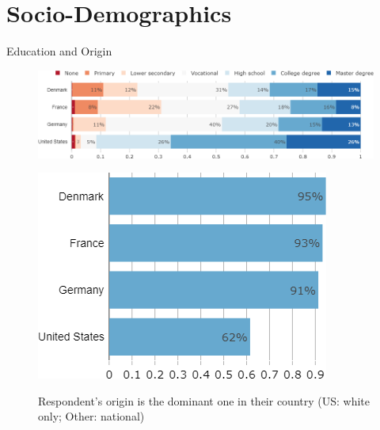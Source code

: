 \documentclass[aspectratio=169,9pt,dvipsnames]{beamer}
\begin{document}
%
%
%
%
%

\section{Socio-Demographics}
\begin{frame}{Education and Origin}%
    \hspace{.2cm}
\begin{figure}[h!]
\centering
\caption{What is the highest level of education you have completed?}
\includegraphics[width=.7\textwidth]{../figures/country_comparison/education_countries.png} \\
\vspace{.3cm}
\caption{Respondent's origin is the dominant one in their country (US: white only; Other: national)} %
\includegraphics[width=.35\textwidth]{../figures/country_comparison/dominant_origin_countries.png}\\
\end{figure}
\end{frame}
\end{document}
